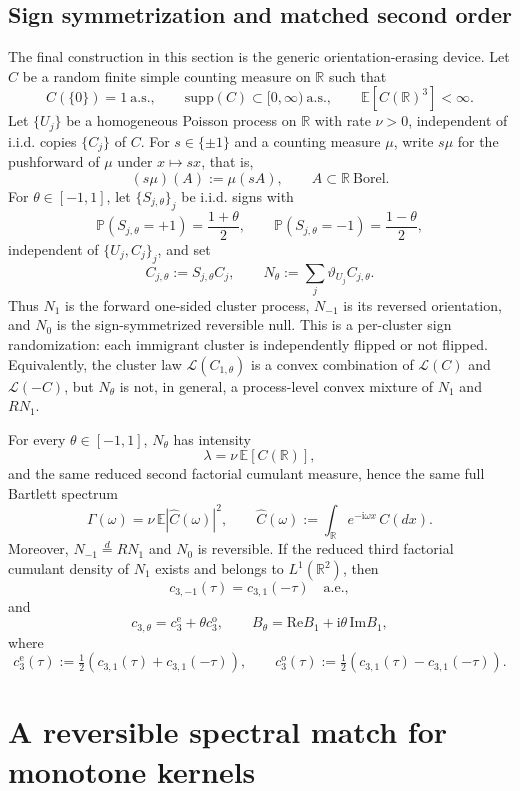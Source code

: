 \documentclass[aap,press]{apt} \volno{00} \partno{00}
\newcommand{\E}{\mathbb{E}}
\newcommand{\PP}{\mathbb{P}}
\newcommand{\R}{\mathbb{R}}
\renewcommand{\ii}{\mathrm{i}}
\newcommand{\1}{\mathbf{1}}
\newcommand{\Law}{\mathcal{L}}
\newcommand{\Ree}{\mathrm{Re}}
\newcommand{\Imm}{\mathrm{Im}}
\numberwithin{equation}{section}
\begin{document}
\subsection{Sign symmetrization and matched second order}

The final construction in this section is the generic orientation-erasing device. Let $C$ be a random finite simple counting measure on $\R$ such that
\[
C(\{0\})=1\ \text{a.s.},\qquad
\mathrm{supp}(C)\subset[0,\infty)\ \text{a.s.},\qquad
\E[C(\R)^3]<\infty.
\]
Let $\{U_j\}$ be a homogeneous Poisson process on $\R$ with rate $\nu>0$, independent of i.i.d. copies $\{C_j\}$ of $C$. For $s\in\{\pm1\}$ and a counting measure $\mu$, write $s\mu$ for the pushforward of $\mu$ under $x\mapsto sx$, that is,
\[
(s\mu)(A):=\mu(sA),\qquad A\subset\R\ \text{Borel}.
\]
For $\theta\in[-1,1]$, let $\{S_{j,\theta}\}_j$ be i.i.d. signs with
\[
\PP(S_{j,\theta}=+1)=\frac{1+\theta}{2},\qquad
\PP(S_{j,\theta}=-1)=\frac{1-\theta}{2},
\]
independent of $\{U_j,C_j\}_j$, and set
\[
C_{j,\theta}:=S_{j,\theta}C_j,
\qquad
N_\theta:=\sum_j \vartheta_{U_j}C_{j,\theta}.
\]
Thus $N_1$ is the forward one-sided cluster process, $N_{-1}$ is its reversed orientation, and $N_0$ is the sign-symmetrized reversible null. This is a per-cluster sign randomization: each immigrant cluster is independently flipped or not flipped. Equivalently, the cluster law $\Law(C_{1,\theta})$ is a convex combination of $\Law(C)$ and $\Law(-C)$, but $N_\theta$ is not, in general, a process-level convex mixture of $N_1$ and $RN_1$.

\begin{prop}\label{prop:sign-symmetrized-family}
For every $\theta\in[-1,1]$, $N_\theta$ has intensity
\[
\lambda=\nu\,\E[C(\R)],
\]
and the same reduced second factorial cumulant measure, hence the same full Bartlett spectrum
\[
\Gamma(\omega)=\nu\,\E |\widehat C(\omega)|^2,
\qquad
\widehat C(\omega):=\int_\R e^{-\ii\omega x}\,C(dx).
\]
Moreover, $N_{-1}\stackrel d=RN_1$ and $N_0$ is reversible. If the reduced third factorial cumulant density of $N_1$ exists and belongs to $L^1(\R^2)$, then
\[
c_{3,-1}(\tau)=c_{3,1}(-\tau)\quad\text{a.e.},
\]
and
\[
c_{3,\theta}=c_3^{\mathrm e}+\theta c_3^{\mathrm o},
\qquad
B_\theta=\Ree B_1+\ii\theta\,\Imm B_1,
\]
where
\[
c_3^{\mathrm e}(\tau):=\tfrac12(c_{3,1}(\tau)+c_{3,1}(-\tau)),
\qquad
c_3^{\mathrm o}(\tau):=\tfrac12(c_{3,1}(\tau)-c_{3,1}(-\tau)).
\]
\end{prop}

\section{A reversible spectral match for monotone kernels}
\end{document}
